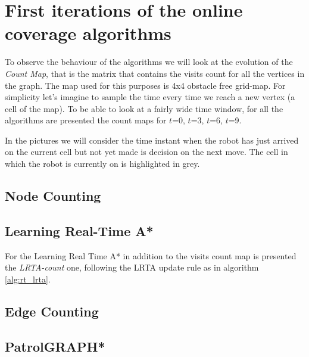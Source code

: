 \chapter{First iterations of the online coverage algorithms}
\label{app:firstSteps}

To observe the behaviour of the algorithms we will look at the evolution of the \emph{Count Map}, that is the matrix that contains the visits count for all the vertices in the graph. The map used for this purposes is 4x4 obstacle free grid-map. For simplicity let's imagine to sample the time every time we reach a new vertex (a cell of the map). To be able to look at a fairly wide time window, for all the algorithms are presented the count maps for $t$=0, $t$=3, $t$=6, $t$=9.

In the pictures we will consider the time instant when the robot has just arrived on the current cell but not yet made is decision on the next move. The cell in which the robot is currently on is highlighted in grey.

\captionsetup[table]{name=Fig.}


\section{Node Counting}



\clearpage

\section{Learning Real-Time A*}
For the Learning Real Time A* in addition to the visits count map is presented the \emph{LRTA-count} one, following the LRTA update rule as in algorithm \ref{alg:rt_lrta}.






\section{Edge Counting}




\section{PatrolGRAPH*}













